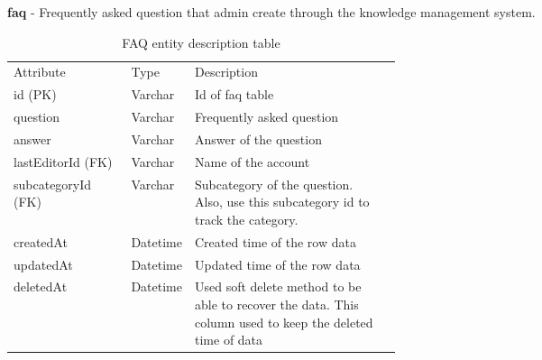 \documentclass[12pt,oneside,openright,a4paper]{cpe-english-project}
\begin{document}
\textbf{faq} - Frequently asked question that admin create through the knowledge management system.
\begin{table}[ht]
	\caption{FAQ entity description table}
	\label{tab:FAQ entity description table}
\begin{adjustbox}{width=\textwidth}
\begin{tabular}{llp{0.5\linewidth}l}
\rowcolor[HTML]{5B9BD5} 
Attribute          & Type     & Description                                                                                                   \\
\rowcolor[HTML]{DEEAF6} 
id (PK)            & Varchar  & Id of faq table                                                                                               \\
question           & Varchar  & Frequently asked   question                                                                                   \\
\rowcolor[HTML]{DEEAF6} 
answer             & Varchar  & Answer of the question                                                                                        \\
lastEditorId (FK)  & Varchar  & Name of the account                                                                                           \\
\rowcolor[HTML]{DEEAF6} 
subcategoryId (FK) & Varchar  & Subcategory of the question. Also, use this subcategory id to track   the category.                           \\
createdAt          & Datetime & Created time of the row   data                                                                                \\
\rowcolor[HTML]{DEEAF6} 
updatedAt          & Datetime & Updated time of the row data                                                                                  \\
deletedAt          & Datetime & Used soft delete method   to be able to recover the data. This column used to keep the deleted time of data
\end{tabular}
\end{adjustbox}
\end{table}
\end{document}
